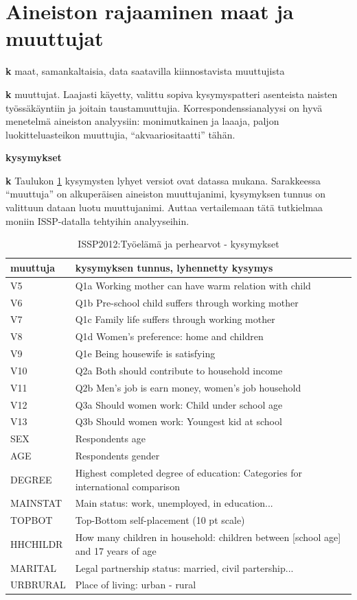 \documentclass[
  finnish,
]{book}
\begin{document}
\hypertarget{aineiston-rajaaminen-maat-ja-muuttujat}{%
\section{Aineiston rajaaminen maat ja muuttujat}\label{aineiston-rajaaminen-maat-ja-muuttujat}}

\textbf{k} maat, samankaltaisia, data saatavilla kiinnostavista muuttujista

\textbf{k} muuttujat. Laajasti käyetty, valittu sopiva kysymyspatteri asenteista naisten
työssäkäyntiin ja joitain taustamuuttujia. Korrespondenssianalyysi on hyvä menetelmä
aineiston analyysiin: monimutkainen ja laaaja, paljon luokitteluasteikon muuttujia,
``akvaariositaatti'' tähän.

\textbf{kysymykset}

\textbf{k} Taulukon \ref{tab:vartable1} kysymysten lyhyet versiot ovat datassa mukana.
Sarakkeessa ``muuttuja'' on alkuperäisen aineiston muuttujanimi,
kysymyksen tunnus on valittuun dataan luotu muuttujanimi. Auttaa vertailemaan tätä
tutkielmaa moniin ISSP-datalla tehtyihin analyyseihin.

\begin{table}

\caption{\label{tab:vartable1}ISSP2012:Työelämä ja perhearvot - kysymykset}
\centering
\begin{tabular}[t]{ll}
\toprule
muuttuja & kysymyksen tunnus, lyhennetty kysymys\\
\midrule
V5 & Q1a Working mother can have warm relation with child\\
V6 & Q1b Pre-school child suffers through working mother\\
V7 & Q1c Family life suffers through working mother\\
V8 & Q1d Women’s preference: home and children\\
V9 & Q1e Being housewife is satisfying\\
\addlinespace
V10 & Q2a Both should contribute to household income\\
V11 & Q2b Men’s job is earn money, women’s job household\\
V12 & Q3a Should women work: Child under school age\\
V13 & Q3b Should women work: Youngest kid at school\\
SEX & Respondents age\\
\addlinespace
AGE & Respondents gender\\
DEGREE & Highest completed degree of education: Categories for international comparison\\
MAINSTAT & Main status: work, unemployed, in education...\\
TOPBOT & Top-Bottom self-placement (10 pt scale)\\
HHCHILDR & How many children in household: children between [school age] and 17 years of age\\
\addlinespace
MARITAL & Legal partnership status: married, civil partership...\\
URBRURAL & Place of living: urban - rural\\
\bottomrule
\end{tabular}
\end{table}
\end{document}
